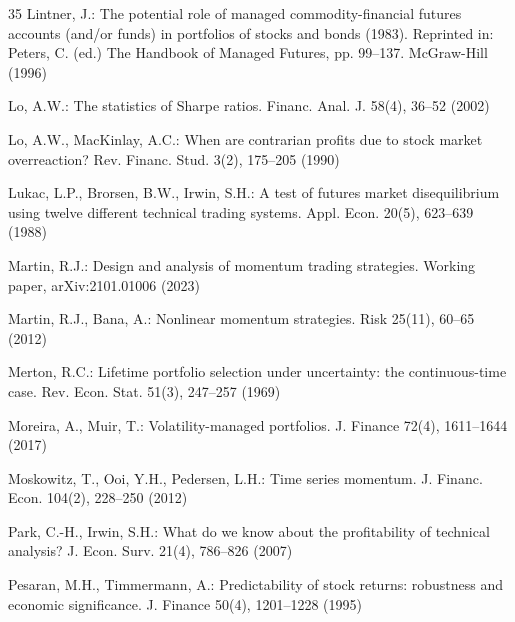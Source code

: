 \documentclass[hidelinks]{siamonline250211}
\begin{document}
\begin{thebibliography}{35}
	 Lintner, J.: The potential role of managed commodity-financial futures accounts (and/or funds) in portfolios of stocks and bonds (1983). Reprinted in: Peters, C. (ed.) The Handbook of Managed Futures, pp. 99--137. McGraw-Hill (1996)
	
	 Lo, A.W.: The statistics of Sharpe ratios. Financ. Anal. J. 58(4), 36--52 (2002)
	
	 Lo, A.W., MacKinlay, A.C.: When are contrarian profits due to stock market overreaction? Rev. Financ. Stud. 3(2), 175--205 (1990)
	
	 Lukac, L.P., Brorsen, B.W., Irwin, S.H.: A test of futures market disequilibrium using twelve different technical trading systems. Appl. Econ. 20(5), 623--639 (1988)
	
	 Martin, R.J.: Design and analysis of momentum trading strategies. Working paper, arXiv:2101.01006 (2023)
	
	 Martin, R.J., Bana, A.: Nonlinear momentum strategies. Risk 25(11), 60--65 (2012)
	
	 Merton, R.C.: Lifetime portfolio selection under uncertainty: the continuous-time case. Rev. Econ. Stat. 51(3), 247--257 (1969)
	
	 Moreira, A., Muir, T.: Volatility-managed portfolios. J. Finance 72(4), 1611--1644 (2017)
	
	 Moskowitz, T., Ooi, Y.H., Pedersen, L.H.: Time series momentum. J. Financ. Econ. 104(2), 228--250 (2012)
	
	 Park, C.-H., Irwin, S.H.: What do we know about the profitability of technical analysis? J. Econ. Surv. 21(4), 786--826 (2007)
	
	 Pesaran, M.H., Timmermann, A.: Predictability of stock returns: robustness and economic significance. J. Finance 50(4), 1201--1228 (1995)
	

\end{thebibliography}
\end{document}
